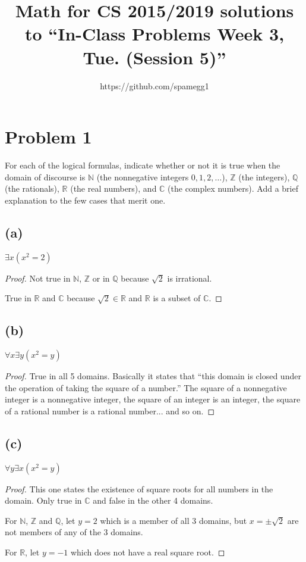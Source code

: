\documentclass[14pt]{extarticle}
\title{Math for CS 2015/2019 solutions to ``In-Class Problems Week 3, Tue. (Session 5)''}
\author{https://github.com/spamegg1}
\begin{document}
\maketitle
\tableofcontents

\section{Problem 1}
For each of the logical formulas, indicate whether or not it is true when the domain of discourse is $\mathbb{N}$ (the nonnegative integers $0, 1, 2, \ldots$), $\mathbb{Z}$ (the integers), $\mathbb{Q}$ (the rationals), $\mathbb{R}$ (the real numbers), and $\mathbb{C}$ (the complex numbers). Add a brief explanation to the few cases that merit one.

\subsection{(a)}
$\exists x(x^2 = 2)$
\begin{proof}
    Not true in $\mathbb{N}$, $\mathbb{Z}$ or in $\mathbb{Q}$ because $\sqrt{2}$ is irrational.

    True in $\mathbb{R}$ and $\mathbb{C}$ because $\sqrt{2} \in \mathbb{R}$ and $\mathbb{R}$ is a subset of $\mathbb{C}$.
\end{proof}

\subsection{(b)}
$\forall x \exists y (x^2 = y)$
\begin{proof}
    True in all 5 domains. Basically it states that ``this domain is closed under the operation of taking the square of a number.'' The square of a nonnegative integer is a nonnegative integer, the square of an integer is an integer, the square of a rational number is a rational number... and so on.
\end{proof}

\subsection{(c)}
$\forall y \exists x (x^2 = y)$
\begin{proof}
    This one states the existence of square roots for all numbers in the domain. Only true in $\mathbb{C}$ and false in the other 4 domains.

    For $\mathbb{N}$, $\mathbb{Z}$ and $\mathbb{Q}$, let $y = 2$ which is a member of all 3 domains, but $x = \pm \sqrt{2}$ are not members of any of the 3 domains.

    For $\mathbb{R}$, let $y = -1$ which does not have a real square root.
\end{proof}
\end{document}
